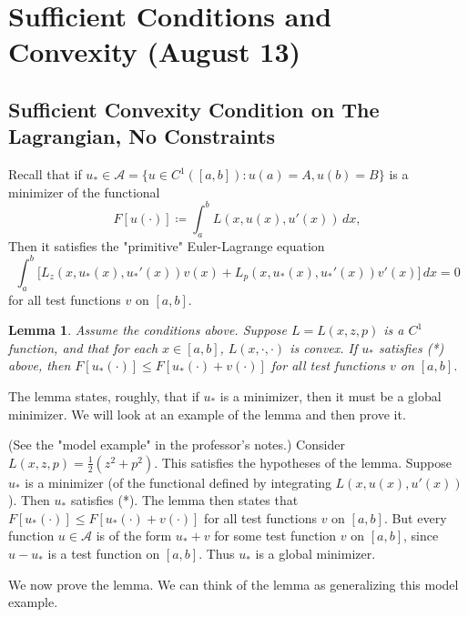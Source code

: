 \documentclass[11pt]{article}
\newtheorem{lemma}[theorem]{Lemma}
\begin{document}
\section{Sufficient Conditions and Convexity (August 13)}

\subsection{Sufficient Convexity Condition on The Lagrangian, No Constraints}

Recall that if $u_* \in \mathcal{A} = \{ u \in C^1([a, b]) : u(a) = A, u(b) = B \}$ is a minimizer of the functional
\[
F[u(\cdot)] \coloneqq \int_a^b L(x, u(x), u'(x)) \, dx,
\]
Then it satisfies the "primitive" Euler-Lagrange equation
\[
\tag{*}
\int_a^b \Bigg[ L_z(x, u_*(x), u_*'(x))v(x) +  L_p(x, u_*(x), u_*'(x))v'(x) \Bigg] \, dx = 0
\]
for all test functions $v$ on $[a, b]$.

\begin{lemma}
Assume the conditions above. Suppose $L = L(x,z,p)$ is a $C^1$ function, and that for each $x \in [a, b]$, $L(x, \cdot, \cdot)$ is convex. If $u_*$ satisfies (*) above, then $F[u_*(\cdot)] \leq F[u_*(\cdot) + v(\cdot)]$ for all test functions $v$ on $[a, b]$.
\end{lemma}

The lemma states, roughly, that if $u_*$ is a minimizer, then it must be a global minimizer. We will look at an example of the lemma and then prove it.

(See the "model example" in the professor's notes.) Consider $L(x,z,p) = \frac{1}{2}(z^2 + p^2)$. This satisfies the hypotheses of the lemma. Suppose $u_*$ is a minimizer (of the functional defined by integrating $L(x, u(x), u'(x))$). Then $u_*$ satisfies (*). The lemma then states that $F[u_*(\cdot)] \leq F[u_*(\cdot) + v(\cdot)]$ for all test functions $v$ on $[a, b]$.  But every function $u \in \mathcal{A}$ is of the form $u_* + v$ for some test function $v$ on $[a, b]$, since $u - u_*$ is a test function on $[a, b]$. Thus $u_*$ is a global minimizer.

We now prove the lemma. We can think of the lemma as generalizing this model example.
\end{document}
